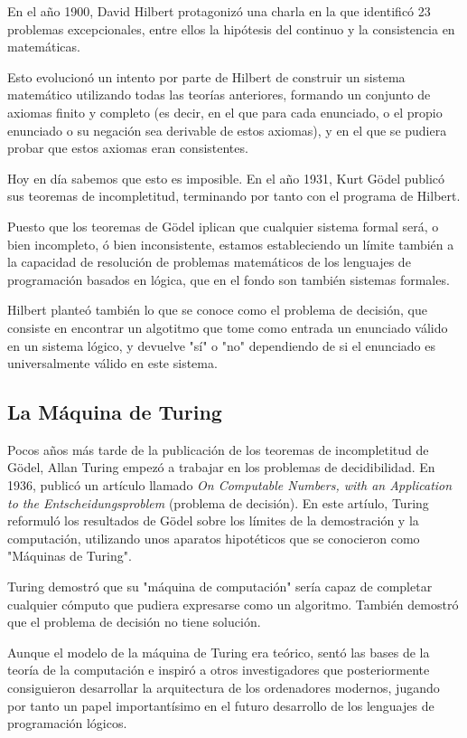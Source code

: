 \documentclass{article}
\begin{document}
En el año 1900, David Hilbert protagonizó una charla en la que identificó 23 problemas excepcionales, entre ellos la hipótesis del continuo y la consistencia en matemáticas.

Esto evolucionó un intento por parte de Hilbert de construir un sistema matemático utilizando todas las teorías anteriores, formando un conjunto de axiomas finito y completo (es decir, en el que para cada enunciado, o el propio enunciado o su negación sea derivable de estos axiomas), y en el que se pudiera probar que estos axiomas eran consistentes.

Hoy en día sabemos que esto es imposible. En el año 1931, Kurt Gödel publicó sus teoremas de incompletitud, terminando por tanto con el programa de Hilbert\cite{blackburn2005oxford}.

Puesto que los teoremas de Gödel iplican que cualquier sistema formal será, o bien incompleto, ó bien inconsistente, estamos estableciendo un límite también a la capacidad de resolución de problemas matemáticos de los lenguajes de programación basados en lógica, que en el fondo son también sistemas formales.

Hilbert planteó también lo que se conoce como el problema de decisión, que consiste en encontrar un algotitmo que tome como entrada un enunciado válido en un sistema lógico, y devuelve "sí" o "no" dependiendo de si el enunciado es universalmente válido en este sistema\cite{blackburn2005oxford}.

\subsection{La Máquina de Turing}

Pocos años más tarde de la publicación de los teoremas de incompletitud de Gödel, Allan Turing empezó a trabajar en los problemas de decidibilidad. En 1936, publicó un artículo llamado \textit{On Computable Numbers, with an Application to the Entscheidungsproblem} (problema de decisión). En este artíulo, Turing reformuló los resultados de Gödel sobre los límites de la demostración y la computación, utilizando unos aparatos hipotéticos que se conocieron como "Máquinas de Turing".

Turing demostró que su "máquina de computación" sería capaz de completar cualquier cómputo que pudiera expresarse como un algoritmo. También demostró que el problema de decisión no tiene solución\cite{wigderson2019mathematics}.

Aunque el modelo de la máquina de Turing era teórico, sentó las bases de la teoría de la computación e inspiró a otros investigadores que posteriormente consiguieron desarrollar la arquitectura de los ordenadores modernos, jugando por tanto un papel importantísimo en el futuro desarrollo de los lenguajes de programación lógicos.
\end{document}

